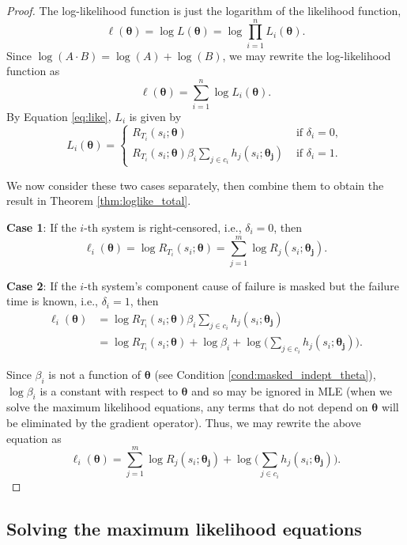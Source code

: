 \documentclass[
]{article}
\begin{document}
\begin{proof}
The log-likelihood function is just the logarithm of the likelihood function,
$$
\ell(\boldsymbol{\theta}) = \log L(\boldsymbol{\theta}) = \log \prod_{i=1}^n L_i(\boldsymbol{\theta}).
$$
Since $\log(A \cdot B) = \log(A) + \log(B)$, we may rewrite the log-likelihood
function as
$$
\ell(\boldsymbol{\theta}) = \sum_{i=1}^n \log L_i(\boldsymbol{\theta}).
$$
By Equation \eqref{eq:like}, $L_i$ is given by
$$
L_i(\boldsymbol{\theta}) =
\begin{cases}
R_{T_i}(s_i;\boldsymbol{\theta}) &\text{ if } \delta_i = 0,\\
R_{T_i}(s_i;\boldsymbol{\theta})
    \beta_i \sum_{j\in c_i} h_j(s_i;\boldsymbol{\theta_j}) &\text{ if } \delta_i = 1.
\end{cases}
$$

We now consider these two cases separately, then combine them to obtain the
result in Theorem \ref{thm:loglike_total}.

\textbf{Case 1}: If the $i$-th system is right-censored, i.e., $\delta_i = 0$, then
$$
\ell_i(\boldsymbol{\theta}) = \log R_{T_i}(s_i;\boldsymbol{\theta}) = \sum_{j=1}^m \log R_j(s_i;\boldsymbol{\theta_j}).
$$

\textbf{Case 2}: If the $i$-th system's component cause of failure is masked but the
failure time is known, i.e., $\delta_i = 1$, then
\begin{align*}
\ell_i(\boldsymbol{\theta})
    &= \log R_{T_i}(s_i;\boldsymbol{\theta}) \beta_i \sum_{j\in c_i} h_j(s_i;\boldsymbol{\theta_j})\\
    &= \log R_{T_i}(s_i;\boldsymbol{\theta}) + \log \beta_i + \log \bigl(\sum_{j\in c_i} h_j(s_i;\boldsymbol{\theta_j})\bigr).
\end{align*}

Since $\beta_i$ is not a function of $\boldsymbol{\theta}$ (see Condition \ref{cond:masked_indept_theta}),
$\log \beta_i$ is a constant with respect to $\boldsymbol{\theta}$ and so may be ignored in MLE
(when we solve the maximum likelihood equations, any terms that do not depend on
$\boldsymbol{\theta}$ will be eliminated by the gradient operator).
Thus, we may rewrite the above equation as
$$
\ell_i(\boldsymbol{\theta}) = \sum_{j=1}^m \log R_j(s_i;\boldsymbol{\theta_j}) +
        \log \biggl(\sum_{j\in c_i} h_j(s_i;\boldsymbol{\theta_j}) \biggr).
$$
\end{proof}

\hypertarget{sec:iterative}{%
\subsection{Solving the maximum likelihood
equations}\label{sec:iterative}}
\end{document}
